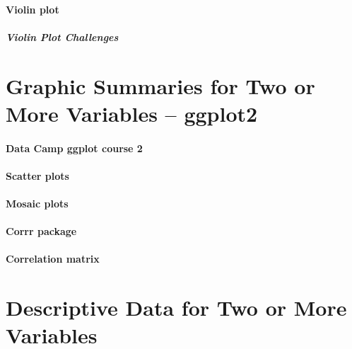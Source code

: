 \documentclass[]{book}
\let\oldparagraph\paragraph
\renewcommand{\paragraph}[1]{\oldparagraph{#1}\mbox{}}
\theoremstyle{definition}
\theoremstyle{definition}
\theoremstyle{definition}
\theoremstyle{remark}
\begin{document}
\hypertarget{violin-plot-1}{%
\subsubsection{Violin plot}\label{violin-plot-1}}

\hypertarget{violin-plot-challenges-1}{%
\paragraph{Violin Plot Challenges}\label{violin-plot-challenges-1}}

\hypertarget{graphic-summaries-for-two-or-more-variables-ggplot2}{%
\chapter{Graphic Summaries for Two or More Variables --
ggplot2}\label{graphic-summaries-for-two-or-more-variables-ggplot2}}

\hypertarget{data-camp-ggplot-course-2}{%
\subsubsection{Data Camp ggplot course
2}\label{data-camp-ggplot-course-2}}

\hypertarget{scatter-plots}{%
\subsubsection{Scatter plots}\label{scatter-plots}}

\hypertarget{mosaic-plots}{%
\subsubsection{Mosaic plots}\label{mosaic-plots}}

\hypertarget{corrr-package}{%
\subsubsection{Corrr package}\label{corrr-package}}

\hypertarget{correlation-matrix}{%
\subsubsection{Correlation matrix}\label{correlation-matrix}}

\hypertarget{descriptive-data-for-two-or-more-variables}{%
\chapter{Descriptive Data for Two or More
Variables}\label{descriptive-data-for-two-or-more-variables}}
\end{document}
